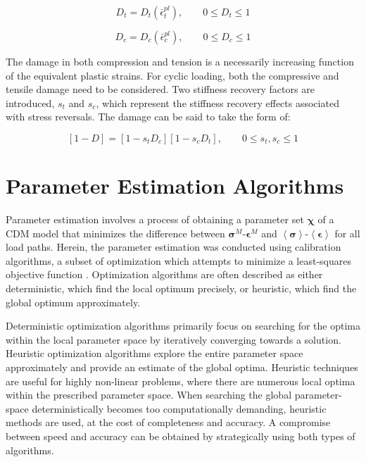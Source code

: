 \begin{equation}
D_{t}=D_{t}\left(\bar{\epsilon}_{t}^{pl}\right),\qquad0\leq D_{t}\leq1
\label{eqn:dam2a}
\end{equation}

\begin{equation}
D_{c}=D_{c}\left(\bar{\epsilon}_{c}^{pl}\right),\qquad0\leq D_{c}\leq1
\label{eqn:dam2b}
\end{equation}

The damage in both compression and tension is a necessarily increasing
function of the equivalent plastic strains. For cyclic loading, both the compressive and tensile damage need to be considered. Two stiffness recovery factors are introduced, $s_{t}$ and $s_{c}$, which represent the stiffness recovery effects associated with stress reversals. The damage can be said to take the form of:

\begin{equation}
\left[1-D\right]=\left[1-s_{t}D_{c}\right]\left[1-s_{c}D_{t}\right],\qquad0\leq s_{t},s_{c}\leq1\label{eqn:dam4}
\end{equation}

\section{Parameter Estimation Algorithms}

Parameter estimation involves a process of obtaining a parameter set $\boldsymbol{\chi}$ of a CDM model that minimizes the difference between $\boldsymbol{\sigma}^M$-$\boldsymbol{\epsilon}^M$ and $\left<\boldsymbol{\sigma}\right>$-$\left<\boldsymbol{\epsilon}\right>$ for all load paths. Herein, the parameter estimation was conducted using calibration algorithms, a subset of optimization which attempts to minimize a least-squares objective function \citep{matott_ostrich:_2008}. Optimization algorithms are often described as either deterministic, which find the local optimum precisely, or heuristic, which find the global optimum approximately.

Deterministic optimization algorithms primarily focus on searching for the optima within the local parameter space by iteratively converging towards a solution. Heuristic optimization algorithms explore the entire parameter space approximately and provide an estimate of the global optima. Heuristic techniques are useful for highly non-linear problems, where there are numerous local optima within the prescribed parameter space. When searching the global parameter-space deterministically becomes too computationally demanding, heuristic methods are used, at the cost of completeness and accuracy. A compromise between speed and accuracy can be obtained by strategically using both types of algorithms.

